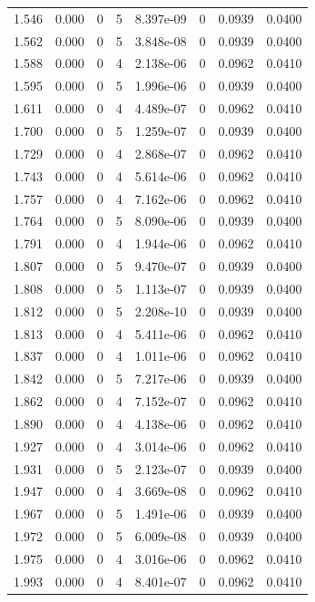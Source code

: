 \documentclass[preview]{standalone}
\begin{document}
{{{\begin{tabular}{L{1.2cm}C{1.2cm} C{0.3cm}C{0.5cm} C{1.4cm}C{1.4cm} C{1.4cm}C{1.4cm}}
  1.546  &  0.000  & 0     &  5 &  8.397e-09  & 0  & 0.0939 &  0.0400   \\ 
  1.562  &  0.000  & 0     &  5 &  3.848e-08  & 0  & 0.0939 &  0.0400   \\ 
  1.588  &  0.000  & 0     &  4 &  2.138e-06  & 0  & 0.0962 &  0.0410   \\ 
  1.595  &  0.000  & 0     &  5 &  1.996e-06  & 0  & 0.0939 &  0.0400   \\ 
  1.611  &  0.000  & 0     &  4 &  4.489e-07  & 0  & 0.0962 &  0.0410   \\ 
  1.700  &  0.000  & 0     &  5 &  1.259e-07  & 0  & 0.0939 &  0.0400   \\ 
  1.729  &  0.000  & 0     &  4 &  2.868e-07  & 0  & 0.0962 &  0.0410   \\ 
  1.743  &  0.000  & 0     &  4 &  5.614e-06  & 0  & 0.0962 &  0.0410   \\ 
  1.757  &  0.000  & 0     &  4 &  7.162e-06  & 0  & 0.0962 &  0.0410   \\ 
  1.764  &  0.000  & 0     &  5 &  8.090e-06  & 0  & 0.0939 &  0.0400   \\ 
  1.791  &  0.000  & 0     &  4 &  1.944e-06  & 0  & 0.0962 &  0.0410   \\ 
  1.807  &  0.000  & 0     &  5 &  9.470e-07  & 0  & 0.0939 &  0.0400   \\ 
  1.808  &  0.000  & 0     &  5 &  1.113e-07  & 0  & 0.0939 &  0.0400   \\ 
  1.812  &  0.000  & 0     &  5 &  2.208e-10  & 0  & 0.0939 &  0.0400   \\ 
  1.813  &  0.000  & 0     &  4 &  5.411e-06  & 0  & 0.0962 &  0.0410   \\ 
  1.837  &  0.000  & 0     &  4 &  1.011e-06  & 0  & 0.0962 &  0.0410   \\ 
  1.842  &  0.000  & 0     &  5 &  7.217e-06  & 0  & 0.0939 &  0.0400   \\ 
  1.862  &  0.000  & 0     &  4 &  7.152e-07  & 0  & 0.0962 &  0.0410   \\ 
  1.890  &  0.000  & 0     &  4 &  4.138e-06  & 0  & 0.0962 &  0.0410   \\ 
  1.927  &  0.000  & 0     &  4 &  3.014e-06  & 0  & 0.0962 &  0.0410   \\ 
  1.931  &  0.000  & 0     &  5 &  2.123e-07  & 0  & 0.0939 &  0.0400   \\ 
  1.947  &  0.000  & 0     &  4 &  3.669e-08  & 0  & 0.0962 &  0.0410   \\ 
  1.967  &  0.000  & 0     &  5 &  1.491e-06  & 0  & 0.0939 &  0.0400   \\ 
  1.972  &  0.000  & 0     &  5 &  6.009e-08  & 0  & 0.0939 &  0.0400   \\ 
  1.975  &  0.000  & 0     &  4 &  3.016e-06  & 0  & 0.0962 &  0.0410   \\ 
  1.993  &  0.000  & 0     &  4 &  8.401e-07  & 0  & 0.0962 &  0.0410   \\ 
\hline 
\end{tabular} 

}}}
\end{document}
